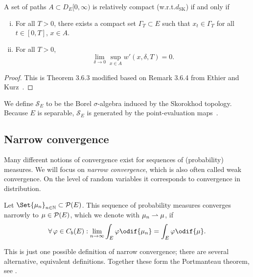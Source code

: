 \begin{theorem}\label{prelim:thm:rel-compact-in-SK}
  A set of paths \(A \subset D_E[0,\infty)\) is relatively compact (w.r.t.\@ \(d_\mathrm{SK}\)) if and only if
  \begin{enumerate}[(i)]
    \item For all \(T > 0\), there exists a compact set \(\Gamma_T \subset E\) such that \(x_t \in \Gamma_T\) for all \(t \in [0,T]\), \(x \in A\).
    \item For all \(T > 0\),
          \begin{equation}
            \lim_{\delta\to0} \sup_{x \in A} w'(x,\delta,T) = 0.
          \end{equation}
  \end{enumerate}
\end{theorem}

\begin{proof}
  This is Theorem 3.6.3 modified based on Remark 3.6.4 from Ethier and Kurz~\cite{ethierMarkovProcessesCharacterization1985}.
\end{proof}

We define \(\mathscr{S}_{E}\) to be the Borel \( \sigma \)-algebra induced by the Skorokhod topology.
Because \(E\) is separable, \(\mathscr{S}_{E}\) is generated by the point-evaluation maps~\cite[Proposition 3.7.1]{ethierMarkovProcessesCharacterization1985}.

\subsection{Narrow convergence}

Many different notions of convergence exist for sequences of (probability) measures.
We will focus on \textit{narrow convergence}, which is also often called weak convergence.
On the level of random variables it corresponds to convergence in distribution.

\begin{definition}\label{def:narrow-conv}
  Let \(\Set{\mu_n}_{n\in\bN} \subset \cP(E)\).
  This sequence of probability measures converges narrowly to \(\mu \in \mathcal{P}(E)\), which we denote with \( \mu_n \rightharpoonup \mu \), if
  \begin{equation}
    \forall \varphi \in C_b(E) : \lim_{n\to\infty} \int_E \varphi \odif{\mu_n} = \int_E \varphi \odif{\mu}.
  \end{equation}
\end{definition}

\begin{remark}
  This is just one possible definition of narrow convergence; there are several alternative, equivalent definitions.
  Together these form the Portmanteau theorem, see \cite[16]{billingsleyConvergenceProbabilityMeasures1999}.
\end{remark}

